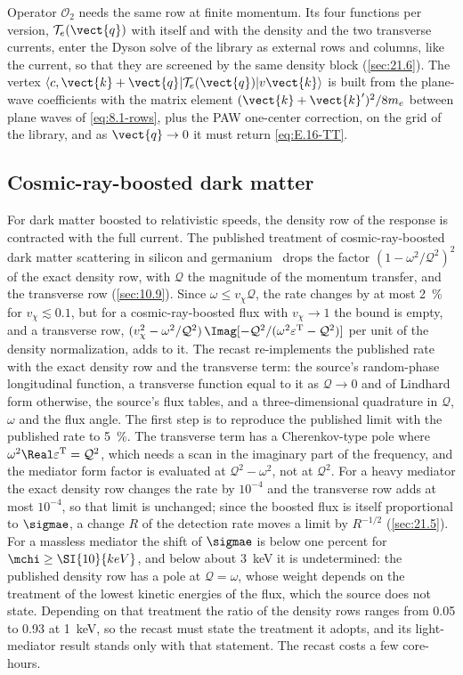 Operator $\mathcal{O}_2$ needs the same row at finite momentum. Its four functions per version, $\mathcal{T}_e(\vect{q})$ with itself and with the density and the two transverse currents, enter the Dyson solve of the library as external rows and columns, like the current, so that they are screened by the same density block (\cref{sec:21.6}). The vertex $\langle c,\vect{k}+\vect{q}|\mathcal{T}_e(\vect{q})|v\vect{k}\rangle$ is built from the plane-wave coefficients with the matrix element $(\vect{k}+\vect{k}')^2/8m_e$ between plane waves of \cref{eq:8.1-rows}, plus the PAW one-center correction, on the grid of the library, and as $\vect{q}\to0$ it must return \cref{eq:E.16-TT}.

\subsection{Cosmic-ray-boosted dark matter}

For dark matter boosted to relativistic speeds, the density row of the response is contracted with the full current. The published treatment of cosmic-ray-boosted dark matter scattering in silicon and germanium~\cite{liang2025plasmon} drops the factor $(1 - \omega^2/\mathcal{Q}^2)^2$ of the exact density row, with $\mathcal{Q}$ the magnitude of the momentum transfer, and the transverse row (\cref{sec:10.9}). Since $\omega \le v_\chi\mathcal{Q}$, the rate changes by at most \SI{2}{\percent} for $v_\chi \lesssim 0.1$, but for a cosmic-ray-boosted flux with $v_\chi \to 1$ the bound is empty, and a transverse row, $(v_\chi^2 - \omega^2/\mathcal{Q}^2)\,\Imag[-\mathcal{Q}^2/(\omega^2\varepsilon^{\mathrm{T}} - \mathcal{Q}^2)]$ per unit of the density normalization, adds to it. The recast re-implements the published rate with the exact density row and the transverse term: the source's random-phase longitudinal function, a transverse function equal to it as $\mathcal{Q}\to0$ and of Lindhard form otherwise, the source's flux tables, and a three-dimensional quadrature in $\mathcal{Q}$, $\omega$ and the flux angle. The first step is to reproduce the published limit with the published rate to \SI{5}{\percent}. The transverse term has a Cherenkov-type pole where $\omega^2\Real\varepsilon^{\mathrm{T}} = \mathcal{Q}^2$, which needs a scan in the imaginary part of the frequency, and the mediator form factor is evaluated at $\mathcal{Q}^2 - \omega^2$, not at $\mathcal{Q}^2$. For a heavy mediator the exact density row changes the rate by $10^{-4}$ and the transverse row adds at most $10^{-4}$, so that limit is unchanged; since the boosted flux is itself proportional to $\sigmae$, a change $R$ of the detection rate moves a limit by $R^{-1/2}$ (\cref{sec:21.5}). For a massless mediator the shift of $\sigmae$ is below one percent for $\mchi \ge \SI{10}{keV}$, and below about \SI{3}{keV} it is undetermined: the published density row has a pole at $\mathcal{Q} = \omega$, whose weight depends on the treatment of the lowest kinetic energies of the flux, which the source does not state. Depending on that treatment the ratio of the density rows ranges from 0.05 to 0.93 at \SI{1}{keV}, so the recast must state the treatment it adopts, and its light-mediator result stands only with that statement. The recast costs a few core-hours.

